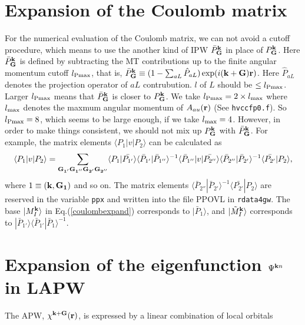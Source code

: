 \documentclass[a4paper,10pt,epsf,fleqn]{article}
\begin{document}
%

\section{Expansion of the Coulomb matrix}
For the numerical evaluation of the Coulomb matrix,
we can not avoid a cutoff procedure, which means to use
the another kind of IPW $\bar{P}^{\bf k}_{{\bf G}}$
in place of $P^{\bf k}_{{\bf G}}$.
Here $\bar{P}^{\bf k}_{{\bf G}}$ is defined by subtracting
the MT contributions up to the finite angular momentum cutoff $l_{\rm Pmax}$,
that is, $\bar{P}^{\bf k}_{{\bf G}} \equiv 
( 1- \sum_{aL} \hat{P}_{aL} ) \exp(i ({\bf k+ G}){\bf r}) $.
Here $\hat{P}_{aL}$ denotes the projection operator of ${aL}$ contrubution.
$l$ of $L$ should be $\le l_{\rm Pmax}$.
Larger $l_{\rm Pmax}$ means that
$\bar{P}^{\bf k}_{{\bf G}}$ is closer to ${P}^{\bf k}_{{\bf G}}$.
We take $l_{\rm Pmax} = 2 \times l_{\rm max}$ where $l_{\rm max}$
denotes the maxmum angular momentum of $A_{au}({\bf r})$ 
(See {\tt hvccfp0.f}). So $l_{\rm Pmax}=8$, which seems to be large enough, 
if we take $l_{\rm max}=4$. However, in order to make things consistent,
we should not mix up $P^{\bf k}_{{\bf G}}$ 
with $\bar{P}^{\bf k}_{{\bf G}}$.
For example, the matrix elements $\langle P_1 |v| P_2 \rangle$ 
can be calculated as
\begin{eqnarray}
\langle P_1 |v| P_2 \rangle = \sum_{\bf G_{1'} G_{1''} G_{2'} G_{2''}} 
\langle P_1 | \bar{P_{1'}} \rangle  
\langle \bar{P}_{1'}| \bar{P}_{1''} \rangle^{-1} 
\langle \bar{P}_{1''} |v| \bar{P_{2''}} \rangle  
\langle \bar{P}_{2''}| \bar{P}_{2'} \rangle^{-1} 
\langle \bar{P_{2'}} | P_2 \rangle,  
\end{eqnarray}
where $1\equiv ({\bf k},{\bf G_1})$ and so on.
The matrix elements
$\langle \bar{P}_{2''}| \bar{P}_{2'} \rangle^{-1} 
\langle \bar{P_{2'}} | P_2 \rangle$
are reserved in the variable {\tt ppx} and written into the file
{\sf PPOVL} in {\tt rdata4gw}.
The base $|M^{\bf k}_I \rangle$ in Eq.(\ref{coulombexpand}) corresponds to $|\bar{P}_1 \rangle$,
and $|\tilde{M}^{\bf k}_I \rangle$ corresponds to
$| \bar{P}_{1'} \rangle \langle \bar{P}_{1'}| \bar{P}_{1} \rangle^{-1}$.



\section{Expansion of the eigenfunction $\Psi^{{\bf k}n}$ in LAPW}
The APW, $\chi^{{\bf k+G}}({\bf r})$, is 
expressed by a linear combination of local orbitals
\end{document}
